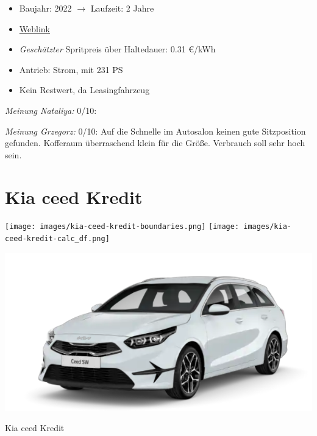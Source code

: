 \documentclass[landscape, DIV=99, 14pt]{scrartcl}
\begin{document}
\begin{itemize}
    \item Baujahr: 2022 $\rightarrow$ Laufzeit: 2 Jahre
    \item \href{https://konfigurator.meinauto.de/hyundai/neuwagen/ioniq/angebote/ioniq-5/konfigurator/\#!/extras/-/8865700/14,19,41/private/104690-6897-293274/4864/61e90b0c48e55/leasing/104690-6897-293274/24,9000,15000,0,0,0,0,0,}{Weblink}
    \item \emph{Gesch\"atzter} Spritpreis \"uber Haltedauer: 0.31 \euro{}/kWh
    \item Antrieb: Strom, mit 231 PS
    \item Kein Restwert, da Leasingfahrzeug
\end{itemize}

\begin{small}
\emph{Meinung Nataliya:} 0/10: 
        
\emph{Meinung Grzegorz:} 0/10: Auf die Schnelle im Autosalon keinen gute Sitzposition gefunden. Kofferaum \"uberraschend klein f\"ur die Gr\"o\ss{}e. Verbrauch soll sehr hoch sein.
\end{small}

\pagebreak


\twocolumn

\section*{Kia ceed Kredit}
\begin{center}
\texttt{[image: images/kia-ceed-kredit-boundaries.png]}
\null
\vspace{0.5cm}
\texttt{[image: images/kia-ceed-kredit-calc\_df.png]}
\end{center}

\pagebreak
\begin{center}
\includegraphics[width=0.9\columnwidth]{cars/kia-ceed-sportswagon.png}

Kia ceed Kredit
\end{center}
\end{document}
